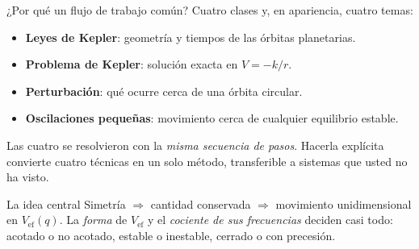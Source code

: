 \documentclass[11pt]{beamer}
\newcommand{\Vef}{V_{\mathrm{ef}}}
\begin{document}
\begin{frame}{¿Por qué un flujo de trabajo común?}
\small
Cuatro clases y, en apariencia, cuatro temas:
\begin{itemize}
  \item \textbf{Leyes de Kepler}: geometría y tiempos de las órbitas planetarias.
  \item \textbf{Problema de Kepler}: solución exacta en $V=-k/r$.
  \item \textbf{Perturbación}: qué ocurre cerca de una órbita circular.
  \item \textbf{Oscilaciones pequeñas}: movimiento cerca de cualquier equilibrio estable.
\end{itemize}
Las cuatro se resolvieron con la \emph{misma secuencia de pasos}. Hacerla explícita convierte cuatro técnicas en un solo método, transferible a sistemas que usted no ha visto.
\vspace{0.4em}
\begin{block}{La idea central}
Simetría $\Rightarrow$ cantidad conservada $\Rightarrow$ movimiento unidimensional en $\Vef(q)$.
La \emph{forma} de $\Vef$ y el \emph{cociente de sus frecuencias} deciden casi todo: acotado o no acotado, estable o inestable, cerrado o con precesión.
\end{block}
\end{frame}

\end{document}
